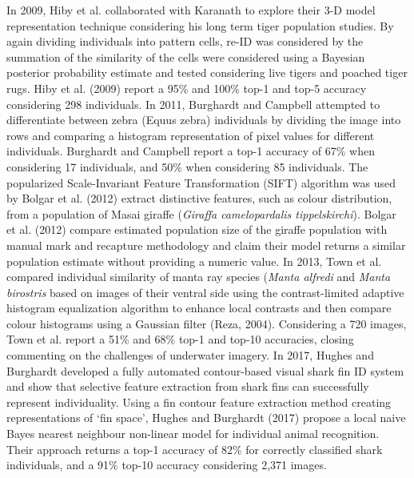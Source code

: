 \documentclass[11pt]{article}
\begin{document}
In 2009, Hiby et al. collaborated with Karanath to explore their 3-D model representation technique considering his long term tiger population studies. By again dividing individuals into pattern cells, re-ID was considered by the summation of the similarity of the cells were considered using a Bayesian posterior probability estimate and tested considering live tigers and poached tiger rugs. Hiby et al. (2009) report a 95\% and 100\% top-1 and top-5 accuracy considering 298 individuals. In 2011, Burghardt and Campbell attempted to differentiate between zebra (Equus zebra) individuals by dividing the image into rows and comparing a histogram representation of pixel values for different individuals. Burghardt and Campbell report a top-1 accuracy of 67\% when considering 17 individuals, and 50\% when considering 85 individuals. The popularized Scale-Invariant Feature Transformation (SIFT) algorithm was used by Bolgar et al. (2012) extract distinctive features, such as colour distribution, from a population of Masai giraffe (\textit{Giraffa camelopardalis tippelskirchi}). Bolgar et al. (2012) compare estimated population size of the giraffe population with manual mark and recapture methodology and claim their model returns a similar population estimate without providing a numeric value. In 2013, Town et al. compared individual similarity of manta ray species (\textit{Manta alfredi} and \textit{Manta birostris} based on images of their ventral side using the contrast-limited adaptive histogram equalization algorithm to enhance local contrasts and then compare colour histograms using a Gaussian filter (Reza, 2004). Considering a 720 images, Town et al. report a 51\% and 68\% top-1 and top-10 accuracies, closing commenting on the challenges of underwater imagery. In 2017, Hughes and Burghardt developed a fully automated contour-based visual shark fin ID system and show that selective feature extraction from shark fins can successfully represent individuality. Using a fin contour feature extraction method creating representations of `fin space', Hughes and Burghardt (2017) propose a local naive Bayes nearest neighbour non-linear model for individual animal recognition. Their approach returns a top-1 accuracy of 82\% for correctly classified shark individuals, and a 91\% top-10 accuracy considering 2,371 images.
\end{document}
